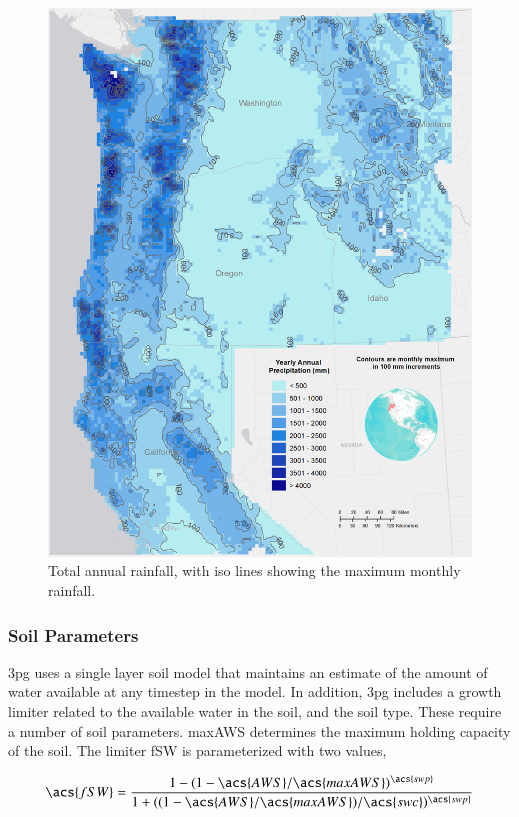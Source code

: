 \documentclass[preprint,12pt]{elsarticle}
\begin{document}
\begin{figure}[hp]
  \centering  
  \includegraphics[width=1.0\linewidth]{precip}  
\caption{Total annual rainfall, with iso lines showing the maximum monthly rainfall.}
  \label{fig:precip}
\end{figure}

\subsubsection{Soil Parameters}
\label{sec:soil}

\ac{3pg} uses a single layer soil model that maintains an estimate of
the amount of water available at any timestep in the model.  In
addition, \ac{3pg} includes a growth limiter related to the available
water in the soil, and the soil type.  These require a number of soil
parameters.  \ac{maxAWS} determines the maximum holding capacity of
the soil.  The limiter \ac{fSW} is parameterized with two values,

\begin{equation*}
\acs{fSW} = \frac{1-(1-\acs{AWS}/\acs{maxAWS})^{\acs{swp}}}{1+((1-\acs{AWS}/\acs{maxAWS})/\acs{swc})^{\acs{swp}}}
\end{equation*} 
\end{document}
